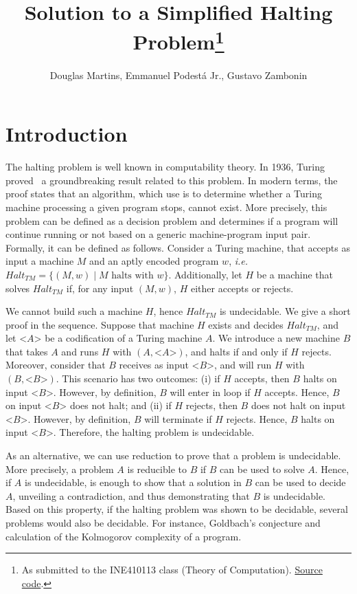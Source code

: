 \documentclass[12pt]{article}
\title{Solution to a Simplified Halting Problem\footnote{
    As submitted to the INE410113 class (Theory of Computation). \href{https://github.com/zambonin/ine410113}{Source code}.}}
\author{Douglas Martins\inst{1}, Emmanuel Podestá Jr.\inst{1}, Gustavo Zambonin\inst{1}}
\begin{document}
 

\maketitle

\section{Introduction}\label{sec:intro}

The halting problem is well known in computability theory. In 1936, Turing proved~\cite{} a groundbreaking result related to this problem. In modern terms, the proof states that an algorithm, which use is to determine whether a Turing machine processing a given program stops, cannot exist. More precisely, this problem can be defined as a decision problem and determines if a program will continue running or not based on a generic machine-program input pair. Formally, it can be defined as follows. Consider a Turing machine, that accepts as input a machine $M$ and an aptly encoded program $w$, \emph{i.e.} $Halt_{TM} = \{(M, w) \mid M \text{ halts with } w\}$. Additionally, let $H$ be a machine that solves $Halt_{TM}$ if, for any input $(M, w)$, $H$ either accepts or rejects. 

We cannot build such a machine $H$, hence $Halt_{TM}$ is undecidable. We give a short proof in the sequence. Suppose that machine $H$ exists and decides $Halt_{TM}$, and let <$A$> be a codification of a Turing machine $A$. We introduce a new machine $B$ that takes $A$ and runs $H$ with $(A, \text{<}A\text{>})$, and halts if and only if $H$ rejects. Moreover, consider that $B$ receives as input <$B$>, and will run $H$ with $(B, \text{<}B\text{>})$. This scenario has two outcomes: (i) if $H$ accepts, then $B$ halts on input <$B$>. However, by definition, $B$ will enter in loop if $H$ accepts. Hence, $B$ on input <$B$> does not halt; and (ii) if $H$ rejects, then $B$ does not halt on input <$B$>. However, by definition, $B$ will terminate if $H$ rejects. Hence, $B$ halts on input <$B$>. Therefore, the halting problem is undecidable.

As an alternative, we can use reduction to prove that a problem is undecidable. More precisely, a problem $A$ is reducible to $B$ if $B$ can be used to solve $A$. Hence, if $A$ is undecidable, is enough to show that a solution in $B$ can be used to decide $A$, unveiling a contradiction, and thus demonstrating that $B$ is undecidable. Based on this property, if the halting problem was shown to be decidable, several problems would also be decidable. For instance, Goldbach's conjecture and calculation of the Kolmogorov complexity of a program.
\end{document}
